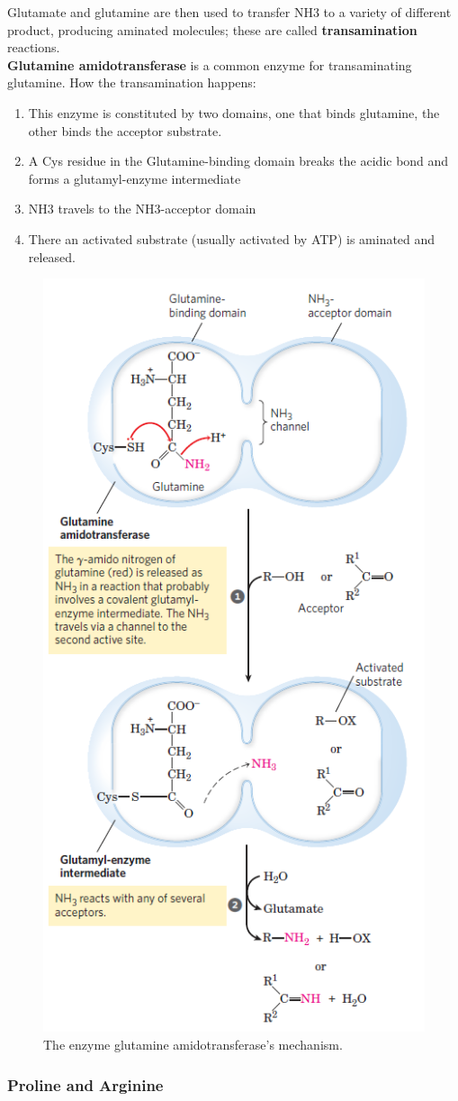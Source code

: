 \documentclass[../main.tex]{subfiles}
\begin{document}
Glutamate and glutamine are then used to transfer NH3 to a variety of different product, producing aminated molecules; these are called \textbf{\gls{transamination}} reactions. \\

\textbf{\gls{Glutamine amidotransferase}} is a common enzyme for transaminating glutamine. How the transamination happens:
\begin{enumerate}
	\item This enzyme is constituted by two domains, one that binds glutamine, the other binds the acceptor substrate.
	\item A Cys residue in the Glutamine-binding domain breaks the acidic bond and forms a glutamyl-enzyme intermediate
	\item NH3 travels to the NH3-acceptor domain
	\item There an activated substrate (usually activated by ATP) is aminated and released.
\end{enumerate}
\begin{figure}[H]
	\centering
	\includegraphics[width=0.5\linewidth]{nit_enz}
	\caption{The enzyme glutamine amidotransferase's mechanism.}
	\label{fig:nitenz}
\end{figure}


\subsubsection{Proline and Arginine}
\end{document}
